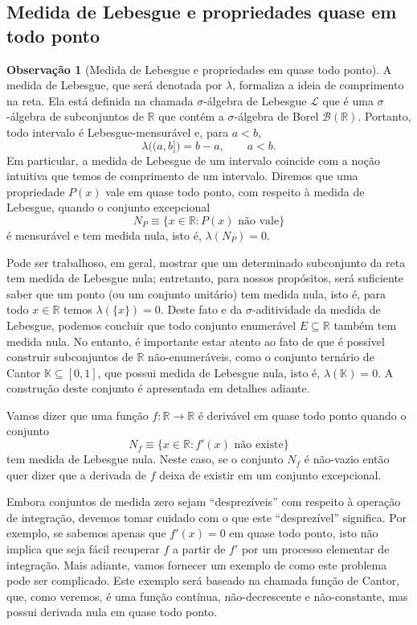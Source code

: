 \documentclass[12pt,portuguese]{article}
\theoremstyle{definition}
\newtheorem{remark}[remark]{Observação}
\theoremstyle{plainexercise}
\theoremstyle{starredexercise}
\theoremstyle{definition}
\begin{document}
\subsection{Medida de Lebesgue e propriedades quase em todo ponto}

\begin{remark}[Medida de Lebesgue e propriedades em quase todo ponto]
\label{rem:medida-lebesgue-qtp}
A medida de Lebesgue, que será denotada por $\lambda$, formaliza a ideia de comprimento na reta.
Ela está definida na chamada $\sigma$-álgebra de Lebesgue $\mathcal{L}$ que é
uma $\sigma$-álgebra de subconjuntos de $\mathbb{R}$ que contém a
$\sigma$-álgebra de Borel $\mathscr{B}(\mathbb{R})$. Portanto, todo intervalo
é Lebesgue-mensurável e, para $a<b$,
\[
  \lambda\bigl((a,b]\bigr)=b-a, \qquad a<b.
\]
Em particular, a medida de Lebesgue de um intervalo coincide com a noção intuitiva que temos
de comprimento de um intervalo. 
Diremos que uma propriedade $P(x)$ vale em quase todo ponto, com respeito à
medida de Lebesgue, quando o conjunto excepcional
\[
  N_P\equiv\{x\in\mathbb{R}: P(x)\text{ não vale}\}
\]
é mensurável e tem medida nula, isto é, $\lambda(N_P)=0$.

Pode ser trabalhoso, em geral, mostrar que um determinado subconjunto da reta
tem medida de Lebesgue nula; entretanto, para nossos propósitos,
será suficiente saber que um ponto (ou um conjunto unitário) tem medida nula, isto é,
para todo $x\in\mathbb{R}$ temos $\lambda(\{x\})=0$. Deste fato e da $\sigma$-aditividade
da medida de Lebesgue, podemos concluir que todo conjunto
enumerável $E\subseteq\mathbb{R}$ também tem medida nula. 
No entanto, é importante estar atento ao fato de que é possível construir 
subconjuntos de $\mathbb{R}$ não-enumeráveis, como 
o conjunto ternário de Cantor $\mathbb{K}\subseteq[0,1]$,
que possui medida de Lebesgue nula, isto é, $\lambda(\mathbb{K})=0$.
A construção deste conjunto é apresentada em detalhes adiante. 


\medskip 

Vamos dizer que uma função $f:\mathbb{R}\to\mathbb{R}$ é derivável em quase
todo ponto quando o conjunto
\[
  N_f\equiv\{x\in\mathbb{R}: f'(x)\text{ não existe}\}
\]
tem medida de Lebesgue nula. Neste caso, se o conjunto $N_{f}$ é não-vazio então  
quer dizer que a derivada de $f$ deixa de existir em um conjunto excepcional. 
  


Embora conjuntos de medida zero sejam ``desprezíveis''
com respeito à operação de integração, devemos tomar cuidado com o que
este ``desprezível'' significa. Por exemplo, se sabemos apenas que $f'(x)=0$ em quase todo
ponto, isto não implica que seja fácil recuperar $f$ a partir de $f'$ por um processo elementar
de integração. Mais adiante, vamos fornecer um exemplo de como este problema pode ser complicado.
Este exemplo será baseado na chamada função de Cantor, que, como veremos, é 
uma função contínua, não-decrescente e não-constante, mas possui 
derivada nula em quase todo ponto.
\end{remark}
\end{document}
